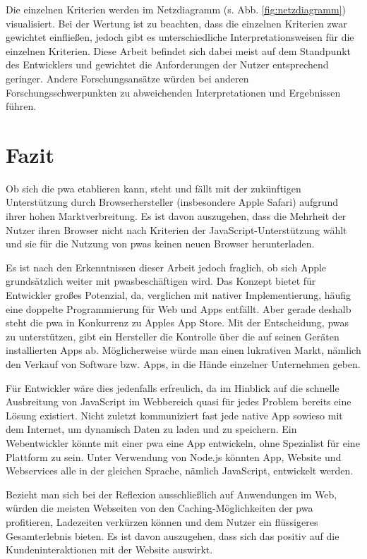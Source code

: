 \newpage

Die einzelnen Kriterien werden im Netzdiagramm (s. Abb. \ref{fig:netzdiagramm}) visualisiert. Bei der Wertung ist zu beachten, dass die einzelnen Kriterien zwar gewichtet einfließen, jedoch gibt es unterschiedliche Interpretationsweisen für die einzelnen Kriterien. Diese Arbeit befindet sich dabei meist auf dem Standpunkt des Entwicklers und gewichtet die Anforderungen der Nutzer entsprechend geringer. Andere Forschungsansätze würden bei anderen Forschungsschwerpunkten zu abweichenden Interpretationen und Ergebnissen führen.

\section{Fazit}

Ob sich die \ac{pwa} etablieren kann, steht und fällt mit der zukünftigen Unterstützung durch Browserhersteller (insbesondere Apple Safari) aufgrund ihrer hohen Marktverbreitung. Es ist davon auszugehen, dass die Mehrheit der Nutzer ihren Browser nicht nach Kriterien der JavaScript-Unterstützung wählt und sie für die Nutzung von \acp{pwa} keinen neuen Browser herunterladen.

Es ist nach den Erkenntnissen dieser Arbeit jedoch fraglich, ob sich Apple grundsätzlich weiter mit \acp{pwa}beschäftigen wird. Das Konzept bietet für Entwickler großes Potenzial, da, verglichen mit nativer Implementierung, häufig eine doppelte Programmierung für Web und Apps entfällt. Aber gerade deshalb steht die \ac{pwa} in Konkurrenz zu Apples App Store. Mit der Entscheidung, \acp{pwa} zu unterstützen, gibt ein Hersteller die Kontrolle über die auf seinen Geräten installierten Apps ab. 
Möglicherweise würde man einen lukrativen Markt, nämlich den Verkauf von Software bzw. Apps, in die Hände einzelner Unternehmen geben.

Für Entwickler wäre dies jedenfalls erfreulich, da im Hinblick auf die schnelle Ausbreitung von JavaScript im Webbereich quasi für jedes Problem bereits eine Lösung existiert. Nicht zuletzt kommuniziert fast jede native App sowieso mit dem Internet, um dynamisch Daten zu laden und zu speichern. Ein Webentwickler könnte mit einer \ac{pwa} eine App entwickeln, ohne Spezialist für eine Plattform zu sein. Unter Verwendung von Node.js könnten App, Website und Webservices alle in der gleichen Sprache, nämlich JavaScript, entwickelt werden.

Bezieht man sich bei der Reflexion ausschließlich auf Anwendungen im Web, würden die meisten Webseiten von den Caching-Möglichkeiten der \ac{pwa} profitieren, Ladezeiten verkürzen können und dem Nutzer ein flüssigeres Gesamterlebnis bieten. Es ist davon auszugehen, dass sich das positiv auf die Kundeninteraktionen mit der Website auswirkt.

